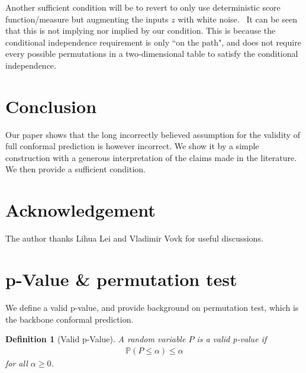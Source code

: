 \documentclass{article}
\newcommand{\prob}[1]{\mathbb{P}\left( #1 \right)}
\newtheorem{definition}{Definition}
\begin{document}
    Another sufficient condition will be to revert to only use deterministic score function/measure but augmenting the inputs $z$ with white noise.~\citep{vovk2005algorithmic} It can be seen that this is not implying nor implied by our condition. This is because the conditional independence requirement is only ``on the path", and does not require every possible permutations in a two-dimensional table to satisfy the conditional independence.
    
\section{Conclusion}

    Our paper shows that the long incorrectly believed assumption for the validity of full conformal prediction is however incorrect. We show it by a simple construction with a generous interpretation of the claims made in the literature. We then provide a sufficient condition.

    

\section*{Acknowledgement}

    The author thanks Lihua Lei and Vladimir Vovk for useful discussions.






\appendix

\section{p-Value \& permutation test}
\label{appendix:pperm}

    We define a valid p-value, and provide background on permutation test, which is the backbone conformal prediction.
    
    \begin{definition}
        [Valid p-Value]
        A random variable $P$ is a valid p-value if
        \begin{align*}
            \prob{P \le \alpha} \le \alpha 
        \end{align*}
        for all $\alpha \ge 0$.
    \end{definition}
    
\end{document}

